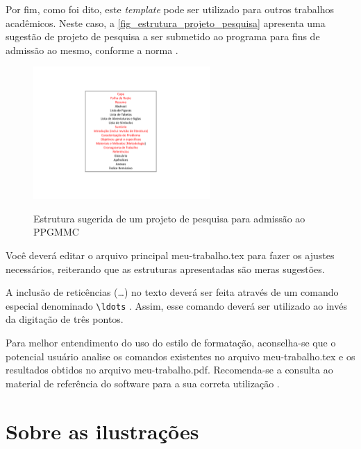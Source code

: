 \begin{apendicesenv}
    Por fim, como foi dito, este \emph{template} pode ser utilizado para outros trabalhos acadêmicos.
    Neste caso, a \autoref{fig_estrutura_projeto_pesquisa} apresenta uma sugestão de projeto de pesquisa a ser submetido ao programa para fins de admissão ao mesmo, conforme a norma .

    \begin{figure}[!htb]
        \centering
        \caption{Estrutura sugerida de um projeto de pesquisa para admissão ao PPGMMC}
        \includegraphics[width=0.6\textwidth]{figuras/estrutura-projeto-pesquisa}
        \label{fig_estrutura_projeto_pesquisa}
    \end{figure}

    Você deverá editar o arquivo principal {\color{red} meu-trabalho.tex} para fazer os ajustes necessários, reiterando que as estruturas apresentadas são meras sugestões.

    A inclusão de reticências (\ldots) no texto deverá ser feita através de um comando especial denominado \verb|\ldots| \cite{LaTeX2014}.
    Assim, esse comando deverá ser utilizado ao invés da digitação de três pontos.

    Para melhor entendimento do uso do estilo de formatação, aconselha-se que o potencial usuário analise os comandos existentes no arquivo {\color{red} meu-trabalho.tex} e os resultados obtidos no arquivo {\color{red} meu-trabalho.pdf}.
    Recomenda-se a consulta ao material de referência do software para a sua correta utilização \cite{Lamport1986,Buerger1989,Kopka2003,Mittelbach2004}.


    \chapter{Sobre as ilustrações}
    \label{chap_sobre_as_ilustracoes}


\end{apendicesenv}
